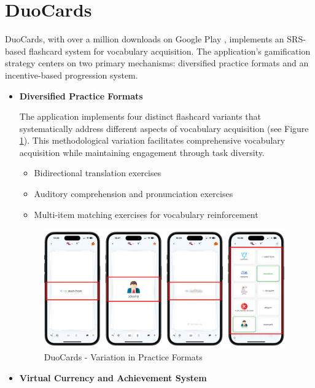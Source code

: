 \section{DuoCards}

DuoCards, with over a million downloads on Google Play \cite{cite:duocards_google_play}, implements an SRS-based flashcard system for vocabulary acquisition. The application's gamification strategy centers on two primary mechanisms: diversified practice formats and an incentive-based progression system.

\begin{itemize}
    \item \textbf{Diversified Practice Formats}

    The application implements four distinct flashcard variants that systematically address different aspects of vocabulary acquisition (see Figure \ref{fig:duocards-flashcard-types}). This methodological variation facilitates comprehensive vocabulary acquisition while maintaining engagement through task diversity.

    \begin{itemize} 
         \item Bidirectional translation exercises
         \item Auditory comprehension and pronunciation exercises
         \item Multi-item matching exercises for vocabulary reinforcement
    \end{itemize}

    \begin{figure}[!h]
        \includegraphics[width=0.98\textwidth]{src/figures/duocards-flashcard-types.png}
        \caption{DuoCards - Variation in Practice Formats}
        \label{fig:duocards-flashcard-types}
    \end{figure}
    
    \item \textbf{Virtual Currency and Achievement System}


\end{itemize}
